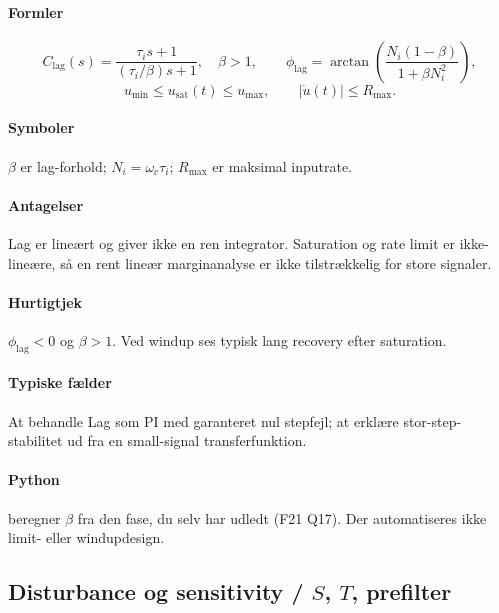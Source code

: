 \paragraph{Formler}
\begin{equation}
\label{eq:lag-controller-phase}
C_{\mathrm{lag}}(s)=\frac{\tau_i s+1}{(\tau_i/\beta)s+1},\quad \beta>1,\qquad
\phi_{\mathrm{lag}}=\arctan\!\left(\frac{N_i(1-\beta)}{1+\beta N_i^2}\right),
\end{equation}
\begin{equation}
\label{eq:actuator-limits}
u_{\min}\leq u_{\mathrm{sat}}(t)\leq u_{\max},\qquad |\dot u(t)|\leq R_{\max}.
\end{equation}

\paragraph{Symboler}
\(\beta\) er lag-forhold; \(N_i=\omega_c\tau_i\); \(R_{\max}\) er maksimal inputrate.

\paragraph{Antagelser}
Lag er lineært og giver ikke en ren integrator. Saturation og rate limit er
ikke-lineære, så en rent lineær marginanalyse er ikke tilstrækkelig for store signaler.

\paragraph{Hurtigtjek}
\(\phi_{\mathrm{lag}}<0\) og \(\beta>1\). Ved windup ses typisk lang recovery efter saturation.

\paragraph{Typiske fælder}
At behandle Lag som PI med garanteret nul stepfejl; at erklære stor-step-stabilitet
ud fra en small-signal transferfunktion.

\paragraph{Python}
 beregner \(\beta\) fra den fase,
du selv har udledt (F21 Q17). Der automatiseres ikke limit- eller windupdesign.

\subsection{Disturbance og sensitivity / \(S\), \(T\), prefilter}
\label{sec:disturbance}

